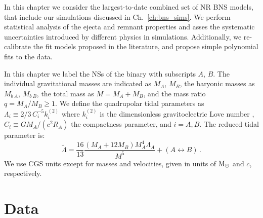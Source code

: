 In this chapter we consider the largest-to-date combined set of \ac{NR} \ac{BNS} models, that 
include our simulations discussed in Ch.~\ref{ch:bns_sims}. 
We perform statistical analysis of the ejecta and remnant properties and 
asses the systematic uncertainties introduced by different 
physics in simulations.
Additionally, we re-calibrate the fit models proposed in the literature, and propose  
simple polynomial fits to the data.



In this chapter we label the \acp{NS} of the binary with subscripts $A$, $B$.
The individual gravitational masses are indicated as $M_A$, $M_B$, 
the baryonic masses as $M_{b~A}$, $M_{b~B}$, 
the total mass as $M = M_A + M_B$, 
and the mass ratio $q=M_A/M_B\geq1$. 
We define the quadrupolar tidal parameters as
$\Lambda_i \equiv 2/3\, C_i^{-5} k^{(2)}_i$
where $k_i^{(2)}$ is the dimensionless gravitoelectric Love number \cite{Damour:2009vw}, 
$C_i \equiv GM_A/(c^2R_A)$ the compactness parameter, and $i=A,B$.
The reduced tidal parameter \cite{Favata:2013rwa} is:
\begin{equation}
\tilde\Lambda = \frac{16}{13}\frac{(M_A+12 M_B)M_A^4 \Lambda_A}{M^5}+(A\leftrightarrow B)\,.
\label{eq:Lambda_tilde}
\end{equation}
We use CGS units except for masses and velocities, given in units of ${\text{M}_{\odot}}$ and $c$, respectively.


\section{Data} 


